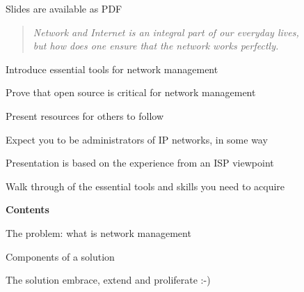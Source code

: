 \documentclass[28pt,landscape,a4paper,footrule]{foils}
\begin{document}


\vskip 2cm
\centerline{\footnotesize Slides are available as PDF}

\large


\begin{quote}
\it Network and Internet is an integral part of our everyday lives, \\but how does one ensure that the network works perfectly.
\end{quote}

\vskip 2cm
\begin{slidelist}
\item Introduce essential tools for network management
\item Prove that open source is critical for network management
\item Present resources for others to follow
\end{slidelist}

\vskip 2cm

\centerline{Expect you to be administrators of IP networks, in some way}




Presentation is based on the experience from an ISP viewpoint

Walk through of the essential tools and skills you need to acquire


\vskip 2cm
\begin{list1}
\item {\bf Contents}
\item The problem: what is network management
\item Components of a solution
\item The solution embrace, extend and proliferate :-)
\end{list1}









\end{document}
